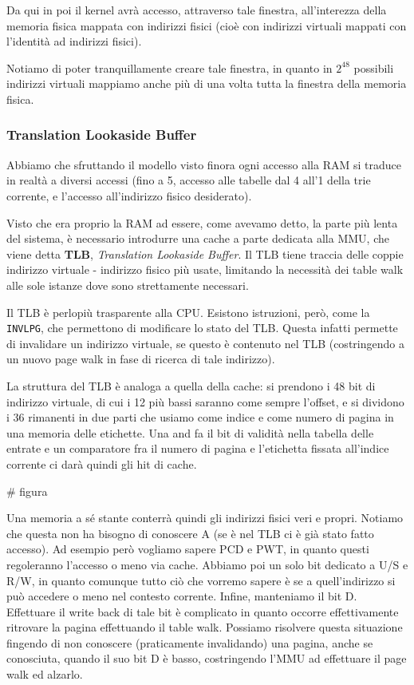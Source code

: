 \documentclass[a4paper,11pt]{article}
\begin{document}
Da qui in poi il kernel avrà accesso, attraverso tale finestra, all'interezza della memoria fisica mappata con indirizzi fisici (cioè con indirizzi virtuali mappati con l'identità ad indirizzi fisici).

Notiamo di poter tranquillamente creare tale finestra, in quanto in $2^{48}$ possibili indirizzi virtuali mappiamo anche più di una volta tutta la finestra della memoria fisica.

\subsubsection{Translation Lookaside Buffer}
Abbiamo che sfruttando il modello visto finora ogni accesso alla RAM si traduce in realtà a diversi accessi (fino a 5, accesso alle tabelle dal 4 all'1 della trie corrente, e l'accesso all'indirizzo fisico desiderato).

Visto che era proprio la RAM ad essere, come avevamo detto, la parte più lenta del sistema, è necessario introdurre una cache a parte dedicata alla MMU, che viene detta \textbf{TLB}, \textit{Translation Lookaside Buffer}.
Il TLB tiene traccia delle coppie indirizzo virtuale - indirizzo fisico più usate, limitando la necessità dei table walk alle sole istanze dove sono strettamente necessari.

Il TLB è perlopiù trasparente alla CPU.
Esistono istruzioni, però, come la \lstinline|INVLPG|, che permettono di modificare lo stato del TLB.
Questa infatti permette di invalidare un indirizzo virtuale, se questo è contenuto nel TLB (costringendo a un nuovo page walk in fase di ricerca di tale indirizzo).

La struttura del TLB è analoga a quella della cache: si prendono i 48 bit di indirizzo virtuale, di cui i 12 più bassi saranno come sempre l'offset, e si dividono i 36 rimanenti in due parti che usiamo come indice e come numero di pagina in una memoria delle etichette.
Una and fa il bit di validità nella tabella delle entrate e un comparatore fra il numero di pagina e l'etichetta fissata all'indice corrente ci darà quindi gli hit di cache.

# figura

Una memoria a sé stante conterrà quindi gli indirizzi fisici veri e propri.
Notiamo che questa non ha bisogno di conoscere A (se è nel TLB ci è già stato fatto accesso).
Ad esempio però vogliamo sapere PCD e PWT, in quanto questi regoleranno l'accesso o meno via cache.
Abbiamo poi un solo bit dedicato a U/S e R/W, in quanto comunque tutto ciò che vorremo sapere è se a quell'indirizzo si può accedere o meno nel contesto corrente.
Infine, manteniamo il bit D.
Effettuare il write back di tale bit è complicato in quanto occorre effettivamente ritrovare la pagina effettuando il table walk.
Possiamo risolvere questa situazione fingendo di non conoscere (praticamente invalidando) una pagina, anche se conosciuta, quando il suo bit D è basso, costringendo l'MMU ad effettuare il page walk ed alzarlo. 
\end{document}
